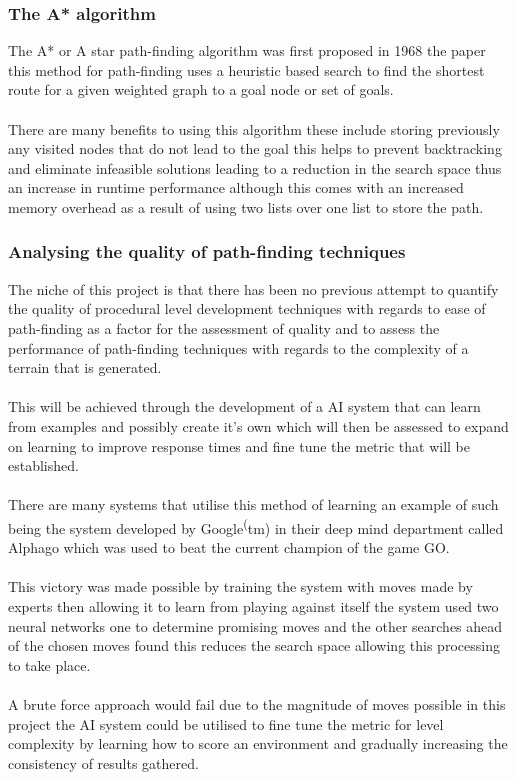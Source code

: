 \subsubsection{The A* algorithm}
The A* or A star path-finding algorithm was first proposed in 1968 the paper \cite{A*} this method for path-finding uses a heuristic based search to find the shortest route for a given weighted graph to a goal node or set of goals.\\\\ There are many benefits to using this algorithm these include storing previously any visited nodes that do not lead to the goal this helps to prevent backtracking and eliminate infeasible solutions leading to a reduction in the search space thus an increase in runtime performance although this comes with an increased memory overhead as a result of using two lists over one list to store the path.   
\subsubsection{Analysing the quality of path-finding techniques}
\label{quality}
The niche of this project is that there has been no previous attempt to quantify the quality of procedural level development techniques with regards to ease of path-finding as a factor for the assessment of quality and  to assess the performance of path-finding techniques with regards to the complexity of a terrain that is generated.\\\\ This will be achieved through the development of a AI system that can learn from examples and possibly create it's own which will then be assessed to expand on learning to improve response times and fine tune the metric that will be established.\\\\ There are many systems that utilise this method of learning an example of such being the system developed by Google\textsuperscript(tm) in their deep mind department called Alphago which was used to beat the current champion of the game GO\cite{AI-learning}.\\\\ This victory was made possible by training the system with moves made by experts then allowing it to learn from playing against itself the system used two neural networks one to determine promising moves and the other searches ahead of the chosen moves found this reduces the search space allowing this processing to take place.\\\\ A brute force approach would fail due to the magnitude of moves possible in this project the AI system could be utilised to fine tune the metric for level complexity by learning how to score an environment and gradually increasing the consistency of results gathered.

